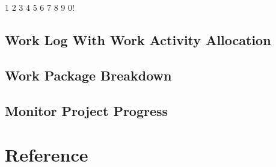\documentclass[11pt]{article}
\begin{document}
1 2 3 4 5 6 7 8 9 0!

\subsection{Work Log With Work Activity Allocation}




\subsection{Work Package Breakdown}

\subsection{Monitor Project Progress}

\section{Reference}
\end{document}
